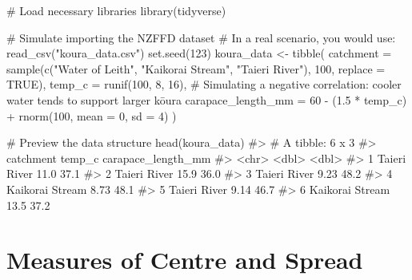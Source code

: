 \documentclass[
  11pt,
  a4paper,
  oneside,
  open=any]{scrbook}
\newenvironment{Shaded}{\begin{snugshade}}{\end{snugshade}}
\newcommand{\AttributeTok}[1]{\textcolor[rgb]{0.40,0.45,0.13}{#1}}
\newcommand{\CommentTok}[1]{\textcolor[rgb]{0.37,0.37,0.37}{#1}}
\newcommand{\ConstantTok}[1]{\textcolor[rgb]{0.56,0.35,0.01}{#1}}
\newcommand{\DecValTok}[1]{\textcolor[rgb]{0.68,0.00,0.00}{#1}}
\newcommand{\FloatTok}[1]{\textcolor[rgb]{0.68,0.00,0.00}{#1}}
\newcommand{\FunctionTok}[1]{\textcolor[rgb]{0.28,0.35,0.67}{#1}}
\newcommand{\NormalTok}[1]{\textcolor[rgb]{0.00,0.23,0.31}{#1}}
\newcommand{\OtherTok}[1]{\textcolor[rgb]{0.00,0.23,0.31}{#1}}
\newcommand{\SpecialCharTok}[1]{\textcolor[rgb]{0.37,0.37,0.37}{#1}}
\newcommand{\StringTok}[1]{\textcolor[rgb]{0.13,0.47,0.30}{#1}}
\begin{document}
\begin{Shaded}
\begin{Highlighting}[]
\CommentTok{\# Load necessary libraries}
\FunctionTok{library}\NormalTok{(tidyverse)}

\CommentTok{\# Simulate importing the NZFFD dataset }
\CommentTok{\# In a real scenario, you would use: read\_csv("koura\_data.csv")}
\FunctionTok{set.seed}\NormalTok{(}\DecValTok{123}\NormalTok{)}
\NormalTok{koura\_data }\OtherTok{\textless{}{-}} \FunctionTok{tibble}\NormalTok{(}
  \AttributeTok{catchment =} \FunctionTok{sample}\NormalTok{(}\FunctionTok{c}\NormalTok{(}\StringTok{"Water of Leith"}\NormalTok{, }\StringTok{"Kaikorai Stream"}\NormalTok{, }\StringTok{"Taieri River"}\NormalTok{), }\DecValTok{100}\NormalTok{, }\AttributeTok{replace =} \ConstantTok{TRUE}\NormalTok{),}
  \AttributeTok{temp\_c =} \FunctionTok{runif}\NormalTok{(}\DecValTok{100}\NormalTok{, }\DecValTok{8}\NormalTok{, }\DecValTok{16}\NormalTok{),}
  \CommentTok{\# Simulating a negative correlation: cooler water tends to support larger kōura}
  \AttributeTok{carapace\_length\_mm =} \DecValTok{60} \SpecialCharTok{{-}}\NormalTok{ (}\FloatTok{1.5} \SpecialCharTok{*}\NormalTok{ temp\_c) }\SpecialCharTok{+} \FunctionTok{rnorm}\NormalTok{(}\DecValTok{100}\NormalTok{, }\AttributeTok{mean =} \DecValTok{0}\NormalTok{, }\AttributeTok{sd =} \DecValTok{4}\NormalTok{) }
\NormalTok{)}

\CommentTok{\# Preview the data structure}
\FunctionTok{head}\NormalTok{(koura\_data)}
\CommentTok{\#\textgreater{} \# A tibble: 6 x 3}
\CommentTok{\#\textgreater{}   catchment       temp\_c carapace\_length\_mm}
\CommentTok{\#\textgreater{}   \textless{}chr\textgreater{}            \textless{}dbl\textgreater{}              \textless{}dbl\textgreater{}}
\CommentTok{\#\textgreater{} 1 Taieri River     11.0                37.1}
\CommentTok{\#\textgreater{} 2 Taieri River     15.9                36.0}
\CommentTok{\#\textgreater{} 3 Taieri River      9.23               48.2}
\CommentTok{\#\textgreater{} 4 Kaikorai Stream   8.73               48.1}
\CommentTok{\#\textgreater{} 5 Taieri River      9.14               46.7}
\CommentTok{\#\textgreater{} 6 Kaikorai Stream  13.5                37.2}
\end{Highlighting}
\end{Shaded}


\chapter{Measures of Centre and
Spread}\label{measures-of-centre-and-spread}
\end{document}
